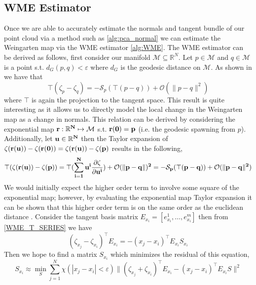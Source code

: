 \documentclass{article}
\begin{document}
\subsection{WME Estimator}
Once we are able to accurately estimate the normals and tangent bundle of our point cloud via a method such as \eqref{alg:pca_normal} we can estimate the Weingarten map via the WME estimator \eqref{alg:WME}. The WME estimator can be derived as follows, first consider our manifold $\mathcal{M} \subseteq \mathbb{R}^N$. Let $p \in  \mathcal{M}$ and $q \in \mathcal{M}$ is a point s.t. $d_G(p,q) <  \varepsilon$ where $d_G$ is the geodesic distance on $\mathcal{M}$. As shown in \cite{Cao_2021} we have that
\begin{equation}
    \top (\zeta_p - \zeta_q) = -\mathcal{S}_p (\top (p-q) ) + \mathcal{O}(\|p - q\|^2)
\end{equation}
where $\top$ is again the projection to the tangent space. This result is quite interesting as it allows us to directly model the local change in the Weingarten map as a change in normals. This relation can be derived by considering the exponential map $\bf{r}: \mathbb{R}^N \mapsto \mathcal{M}$ s.t. $\bf{r(0)} = p$ (i.e. the geodesic spawning from $p$). Additionally, let $\bf{u} \in \mathbb{R}^N$ then the Taylor expansion of $\zeta(\bf{r}(u)) - \zeta(\bf{r}(0)) = \zeta(\bf{r}(u)) - \zeta(p)$ results in the following,
\begin{equation} \label{WME_T_SERIES}
    \top (\zeta(\bf{r}(u)) - \zeta(p)) = \top (\sum_{i=1}^N u^i \frac{\partial \zeta}{\partial u^i}) + \mathcal{O}(\|p - q\|)^2 = -\mathcal{S}_p (\top (p-q) ) + \mathcal{O}(\|p - q\|^2)
\end{equation}
We would initially expect the higher order term to involve some square of the exponential map; however, by evaluating the exponential map Taylor expansion it can be shown that this higher order term is on the same order as the euclidean distance \cite{Cao_2021,monera2014taylor}. Consider the tangent basis matrix $E_{x_i} = [e_{x_i}^1,\ldots,e_{x_i}^m]$ then from \eqref{WME_T_SERIES} we have 
\begin{equation}
    (\zeta_{x_j} - \zeta_{x_i})^{\intercal} E_{x_i} = -(x_j - x_i)^{\intercal} E_{x_i} S_{x_i}
\end{equation}
Then we hope to find a matrix $S_{x_i}$ which minimizes the residual of this equation,
\begin{equation} \label{WME_MSE_FORM}
    S_{x_i} \approx \min_{S} \sum_{j=1}^N \chi(|x_j - x_i| < \varepsilon)  \|(\zeta_{x_j} + \zeta_{x_i})^{\intercal}E_{x_i} - (x_j - x_i)^{\intercal}E_{x_i}S\|^2  
\end{equation}
\end{document}
